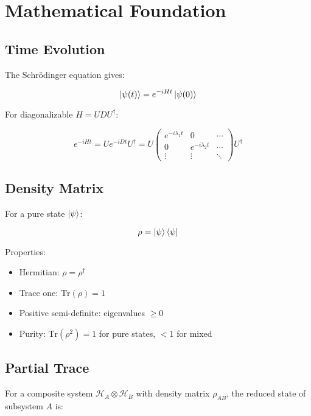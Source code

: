 \documentclass[11pt,a4paper]{article}
\begin{document}
\section{Mathematical Foundation}

\subsection{Time Evolution}

The Schr\"odinger equation gives:

\begin{equation}
    \ket{\psi(t)} = e^{-iHt}\ket{\psi(0)}
\end{equation}

For diagonalizable $H = UDU^\dagger$:

\begin{equation}
    e^{-iHt} = U e^{-iDt} U^\dagger = U \begin{pmatrix}
        e^{-i\lambda_1 t} & 0 & \cdots \\
        0 & e^{-i\lambda_2 t} & \cdots \\
        \vdots & \vdots & \ddots
    \end{pmatrix} U^\dagger
\end{equation}

\subsection{Density Matrix}

For a pure state $\ket{\psi}$:

\begin{equation}
    \rho = \ket{\psi}\bra{\psi}
\end{equation}

Properties:
\begin{itemize}
    \item Hermitian: $\rho = \rho^\dagger$
    \item Trace one: $\text{Tr}(\rho) = 1$
    \item Positive semi-definite: eigenvalues $\geq 0$
    \item Purity: $\text{Tr}(\rho^2) = 1$ for pure states, $< 1$ for mixed
\end{itemize}

\subsection{Partial Trace}

For a composite system $\mathcal{H}_A \otimes \mathcal{H}_B$ with density matrix $\rho_{AB}$, the reduced state of subsystem $A$ is:
\end{document}
